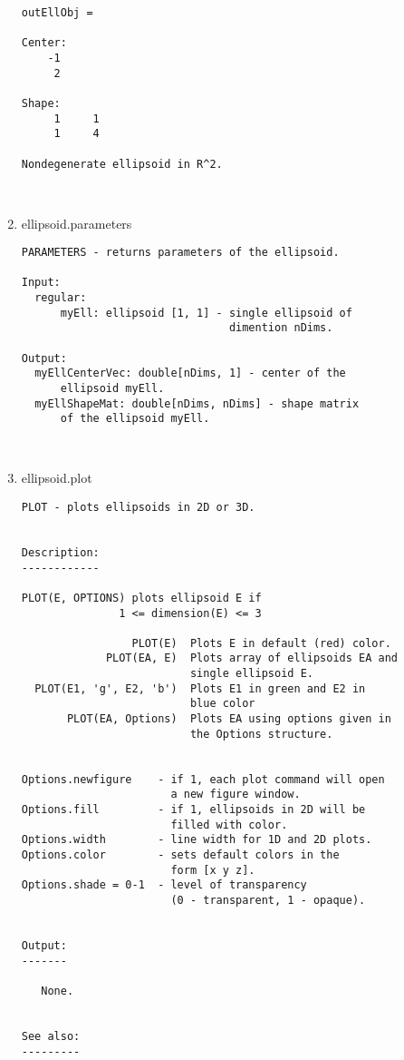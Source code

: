 \begin{enumerate}
\begin{lstlisting}
outEllObj =

Center:
    -1
     2

Shape:
     1     1
     1     4

Nondegenerate ellipsoid in R^2.



\end{lstlisting}
\fontfamily{\familydefault}
\selectfont
\item {ellipsoid.parameters}
\selectfont
\begin{lstlisting}
PARAMETERS - returns parameters of the ellipsoid.

Input:
  regular:
      myEll: ellipsoid [1, 1] - single ellipsoid of
                                dimention nDims.

Output:
  myEllCenterVec: double[nDims, 1] - center of the
      ellipsoid myEll.
  myEllShapeMat: double[nDims, nDims] - shape matrix
      of the ellipsoid myEll.



\end{lstlisting}
\fontfamily{\familydefault}
\selectfont
\item {ellipsoid.plot}
\selectfont
\begin{lstlisting}
PLOT - plots ellipsoids in 2D or 3D.


Description:
------------

PLOT(E, OPTIONS) plots ellipsoid E if
               1 <= dimension(E) <= 3

                 PLOT(E)  Plots E in default (red) color.
             PLOT(EA, E)  Plots array of ellipsoids EA and
                          single ellipsoid E.
  PLOT(E1, 'g', E2, 'b')  Plots E1 in green and E2 in
                          blue color
       PLOT(EA, Options)  Plots EA using options given in
                          the Options structure.


Options.newfigure    - if 1, each plot command will open
                       a new figure window.
Options.fill         - if 1, ellipsoids in 2D will be
                       filled with color.
Options.width        - line width for 1D and 2D plots.
Options.color        - sets default colors in the
                       form [x y z].
Options.shade = 0-1  - level of transparency
                       (0 - transparent, 1 - opaque).


Output:
-------

   None.


See also:
---------


\end{lstlisting}
\end{enumerate}
